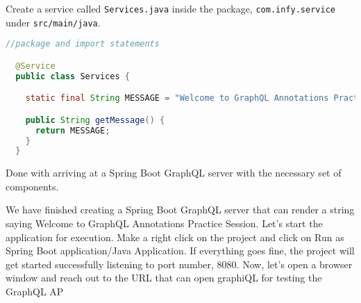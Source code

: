 \documentclass[../main.tex]{subfiles}
\begin{document}
Create a service called \lstinline{Services.java} inside the package, \lstinline{com.infy.service} under \lstinline{src/main/java}.
\begin{lstlisting}[language=java]
  //package and import statements

  @Service
  public class Services {

    static final String MESSAGE = "Welcome to GraphQL Annotations Practice Session";

    public String getMessage() {
      return MESSAGE;
    }
  }
\end{lstlisting}
Done with arriving at a Spring Boot GraphQL server with the necessary set of components.

We have finished creating a Spring Boot GraphQL server that can render a string saying Welcome to GraphQL Annotations Practice Session.
Let’s start the application for execution. 
Make a right click on the project and click on Run as Spring Boot application/Java Application.
If everything goes fine, the project will get started successfully listening to port number, 8080.
Now, let’s open a browser window and reach out to the URL that can open graphiQL for testing the GraphQL AP

\href{http://localhost:8080/graphiql}{\color{blue}{localhost:8080/graphiql}}
\end{document}
